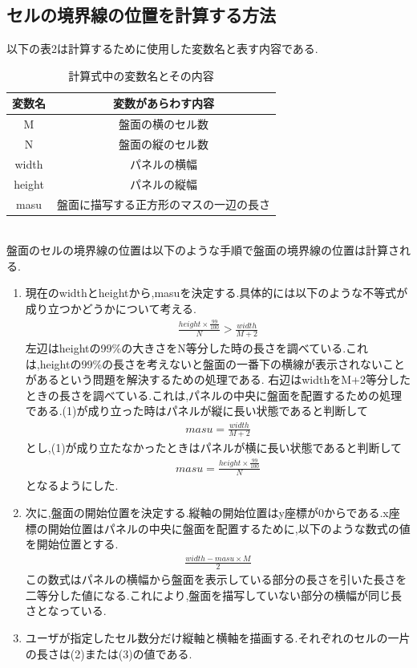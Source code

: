 \documentclass[dvipdfmx]{jarticle}
\begin{document}
\subsection{セルの境界線の位置を計算する方法}
以下の表2は計算するために使用した変数名と表す内容である.
\begin{table}[h]
\centering
\begin{tabular}{|c||c|}
    \hline
    変数名 & 変数があらわす内容\\
    \hline\hline
    M & 盤面の横のセル数\\\hline
    N & 盤面の縦のセル数\\\hline
    width & パネルの横幅\\\hline
    height & パネルの縦幅\\\hline
    masu & 盤面に描写する正方形のマスの一辺の長さ\\\hline
\end{tabular}
\caption{計算式中の変数名とその内容}
\end{table}
\\盤面のセルの境界線の位置は以下のような手順で盤面の境界線の位置は計算される.
\begin{enumerate}
    \item 現在のwidthとheightから,masuを決定する.具体的には以下のような不等式が成り立つかどうかについて考える.
    \begin{align}
        \frac{height\times\frac{99}{100}}{N} > \frac{width}{M+2}
    \end{align}
    左辺はheightの99\%の大きさをN等分した時の長さを調べている.これは,heightの99\%の長さを考えないと盤面の一番下の横線が表示されないことがあるという問題を解決するための処理である.
    右辺はwidthをM+2等分したときの長さを調べている.これは,パネルの中央に盤面を配置するための処理である.(1)が成り立った時はパネルが縦に長い状態であると判断して
    \begin{align}
        masu=\frac{width}{M+2}
    \end{align}
    とし,(1)が成り立たなかったときはパネルが横に長い状態であると判断して
    \begin{align}
        masu = \frac{height\times\frac{99}{100}}{N}
    \end{align}
    となるようにした.
    \item 次に,盤面の開始位置を決定する.縦軸の開始位置はy座標が0からである.x座標の開始位置はパネルの中央に盤面を配置するために,以下のような数式の値を開始位置とする.
    \begin{align}
        \frac{width-masu\times M}{2}
    \end{align}
    この数式はパネルの横幅から盤面を表示している部分の長さを引いた長さを二等分した値になる.これにより,盤面を描写していない部分の横幅が同じ長さとなっている.
    \item ユーザが指定したセル数分だけ縦軸と横軸を描画する.それぞれのセルの一片の長さは(2)または(3)の値である.
\end{enumerate}
\clearpage
\end{document}
